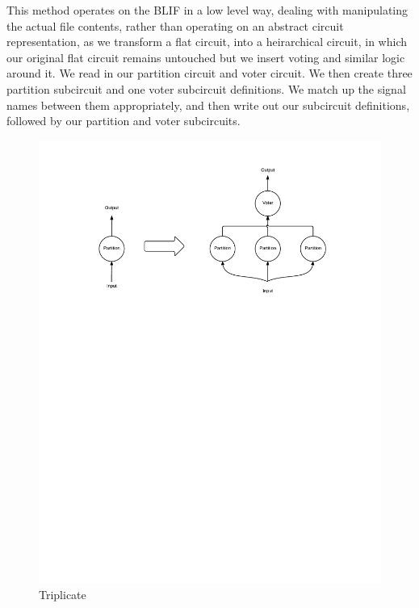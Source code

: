 \documentclass[12pt,final,oneside]{dwThesis} %
\begin{document}
   This method operates on the \gls{BLIF} in a low level way, dealing with
   manipulating the actual file contents, rather than operating on an abstract
   circuit representation, as we transform a flat circuit, into a heirarchical
   circuit, in which our original flat circuit remains untouched but we insert
   voting and similar logic around it.  We read in our partition circuit and
   voter circuit. We then create three partition subcircuit and one voter
   subcircuit definitions. We match up the signal names between them
   appropriately, and then write out our subcircuit definitions, followed by
   our partition and voter subcircuits.


   \begin{figure}

      \begin{center}

         \includegraphics[width=\linewidth]{images/Triplicate.pdf}
         \caption{Triplicate} \label{imTriplicate} 
      \end{center}

   \end{figure}
\end{document}
